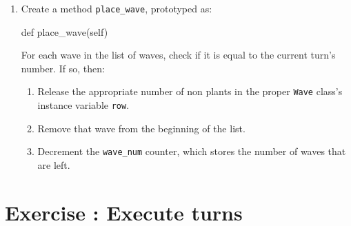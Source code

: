 \documentclass{42-en}
\begin{document}
\begin{enumerate}
    \item Create a method \texttt{place\_wave}, prototyped as:
\begin{42pycode}
def place_wave(self)
\end{42pycode}
For each wave in the list of waves, check if it is equal to the current turn's number. If so, then:
 \begin{enumerate}\itemsep7pt
    \item Release the appropriate number of non plants in the proper \texttt{Wave} class's instance variable \texttt{row}.
    \item Remove that wave from the beginning of the list.
    \item Decrement the \texttt{wave\_num} counter, which stores the number of waves that are left.
  \end{enumerate}
  \end{enumerate}
\nextexercice
 \chapter{Exercise \exercicenumber: Execute turns}

\exnumber{\exercicenumber}
\end{document}
